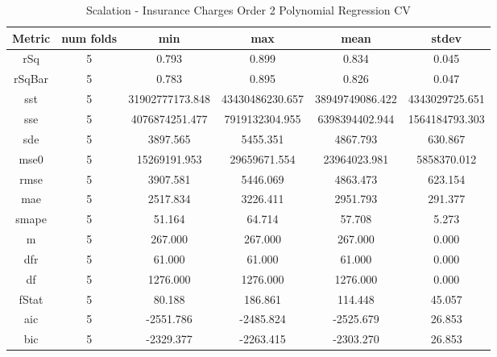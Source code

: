 \documentclass{article}
\begin{document}
\begin{table}[H]
\centering
\caption{Scalation - Insurance Charges Order 2 Polynomial Regression CV}
\label{tab:Scalation - Insurance Charges Order 2 Polynomial Regression CV}
\begin{tabular}{|c|c|c|c|c|c|}\hline
Metric & num folds & min & max & mean & stdev \\ \hline \hline
rSq & 5 & 0.793 & 0.899 & 0.834 & 0.045 \\ \hline
rSqBar & 5 & 0.783 & 0.895 & 0.826 & 0.047 \\ \hline
sst & 5 & 31902777173.848 & 43430486230.657 & 38949749086.422 & 4343029725.651 \\ \hline
sse & 5 & 4076874251.477 & 7919132304.955 & 6398394402.944 & 1564184793.303 \\ \hline
sde & 5 & 3897.565 & 5455.351 & 4867.793 & 630.867 \\ \hline
mse0 & 5 & 15269191.953 & 29659671.554 & 23964023.981 & 5858370.012 \\ \hline
rmse & 5 & 3907.581 & 5446.069 & 4863.473 & 623.154 \\ \hline
mae & 5 & 2517.834 & 3226.411 & 2951.793 & 291.377 \\ \hline
smape & 5 & 51.164 & 64.714 & 57.708 & 5.273 \\ \hline
m & 5 & 267.000 & 267.000 & 267.000 & 0.000 \\ \hline
dfr & 5 & 61.000 & 61.000 & 61.000 & 0.000 \\ \hline
df & 5 & 1276.000 & 1276.000 & 1276.000 & 0.000 \\ \hline
fStat & 5 & 80.188 & 186.861 & 114.448 & 45.057 \\ \hline
aic & 5 & -2551.786 & -2485.824 & -2525.679 & 26.853 \\ \hline
bic & 5 & -2329.377 & -2263.415 & -2303.270 & 26.853 \\ \hline
\end{tabular}
\end{table}
\end{document}
